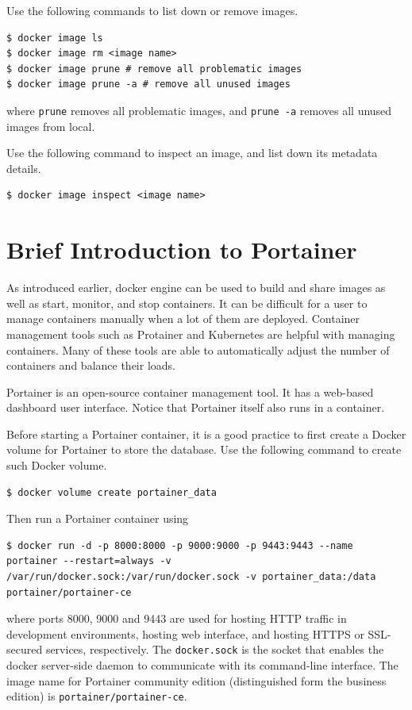 Use the following commands to list down or remove images.
\begin{lstlisting}
$ docker image ls
$ docker image rm <image name>
$ docker image prune # remove all problematic images
$ docker image prune -a # remove all unused images
\end{lstlisting}
where \verb|prune| removes all problematic images, and \verb|prune -a| removes all unused images from local.

Use the following command to inspect an image, and list down its metadata details.
\begin{lstlisting}
$ docker image inspect <image name>
\end{lstlisting}

\section{Brief Introduction to Portainer}

As introduced earlier, docker engine can be used to build and share images as well as start, monitor, and stop containers. It can be difficult for a user to manage containers manually when a lot of them are deployed. Container management tools such as Protainer and Kubernetes are helpful with managing containers. Many of these tools are able to automatically adjust the number of containers and balance their loads.

Portainer is an open-source container management tool. It has a web-based dashboard user interface. Notice that Portainer itself also runs in a container.

Before starting a Portainer container, it is a good practice to first create a Docker volume for Portainer to store the database. Use the following command to create such Docker volume.
\begin{lstlisting}
$ docker volume create portainer_data
\end{lstlisting}
Then run a Portainer container using
\begin{lstlisting}
$ docker run -d -p 8000:8000 -p 9000:9000 -p 9443:9443 --name portainer --restart=always -v /var/run/docker.sock:/var/run/docker.sock -v portainer_data:/data portainer/portainer-ce
\end{lstlisting}
where ports 8000, 9000 and 9443 are used for hosting HTTP traffic in development environments, hosting web interface, and hosting HTTPS or SSL-secured services, respectively. The \verb|docker.sock| is the socket that enables the docker server-side daemon to communicate with its command-line interface. The image name for Portainer community edition (distinguished form the business edition) is \verb|portainer/portainer-ce|.

